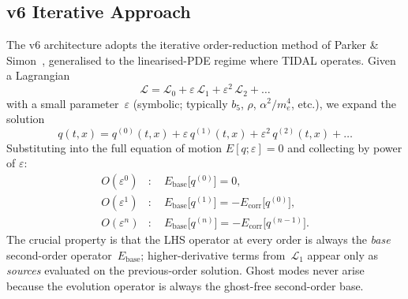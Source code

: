 \subsection{v6 Iterative Approach}
\label{sec:pr-v6}

The v6 architecture adopts the iterative order-reduction method of Parker \& Simon~\cite{ParkerSimon1993}, generalised to the linearised-PDE regime where TIDAL operates. Given a Lagrangian
\begin{equation}
  \mathcal{L} = \mathcal{L}_0 + \varepsilon\, \mathcal{L}_1 + \varepsilon^2\, \mathcal{L}_2 + \ldots
\end{equation}
with a small parameter~$\varepsilon$ (symbolic; typically $b_5$, $\rho$, $\alpha^2/m_e^4$, etc.), we expand the solution
\begin{equation}
  q(t, x) = q^{(0)}(t, x) + \varepsilon\, q^{(1)}(t, x) + \varepsilon^2\, q^{(2)}(t, x) + \ldots
\end{equation}
Substituting into the full equation of motion $E[q; \varepsilon] = 0$ and collecting by power of $\varepsilon$:
\begin{align}
  O(\varepsilon^0) &: \quad E_{\mathrm{base}}\bigl[q^{(0)}\bigr] = 0, \\
  O(\varepsilon^1) &: \quad E_{\mathrm{base}}\bigl[q^{(1)}\bigr] = -E_{\mathrm{corr}}\bigl[q^{(0)}\bigr], \\
  O(\varepsilon^n) &: \quad E_{\mathrm{base}}\bigl[q^{(n)}\bigr] = -E_{\mathrm{corr}}\bigl[q^{(n-1)}\bigr].
\end{align}
The crucial property is that the LHS operator at every order is always the \emph{base} second-order operator~$E_{\mathrm{base}}$; higher-derivative terms from~$\mathcal{L}_1$ appear only as \emph{sources} evaluated on the previous-order solution. Ghost modes never arise because the evolution operator is always the ghost-free second-order base.

